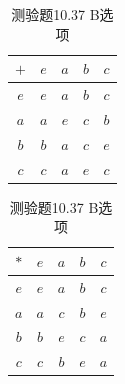 \documentclass[UTF8, heading=true]{ctexart}
\begin{document}
\begin{table}[H]
  \centering
  \renewcommand{\arraystretch}{1.3}
  \begin{minipage}{0.45\textwidth}
    \centering
    \begin{tabular}{c|cccc}
      \hline
      $+$ & $e$ & $a$ & $b$ & $c$ \\
      \hline
      $e$ & $e$ & $a$ & $b$ & $c$ \\
      $a$ & $a$ & $e$ & $c$ & $b$ \\
      $b$ & $b$ & $a$ & $c$ & $e$ \\
      $c$ & $c$ & $a$ & $e$ & $c$ \\
      \hline
    \end{tabular}
    \vspace{0.5cm}
    \caption{测验题10.37 A选项}
  \end{minipage}
  \hspace{0.05\textwidth}
  \begin{minipage}{0.45\textwidth}
    \centering
    \begin{tabular}{c|cccc}
      \hline
      $*$ & $e$ & $a$ & $b$ & $c$ \\
      \hline
      $e$ & $e$ & $a$ & $b$ & $c$ \\
      $a$ & $a$ & $c$ & $b$ & $e$ \\
      $b$ & $b$ & $e$ & $c$ & $a$ \\
      $c$ & $c$ & $b$ & $e$ & $a$ \\
      \hline
    \end{tabular}
    \vspace{0.5cm}
    \caption{测验题10.37 B选项}
  \end{minipage}
\end{table}
\end{document}
